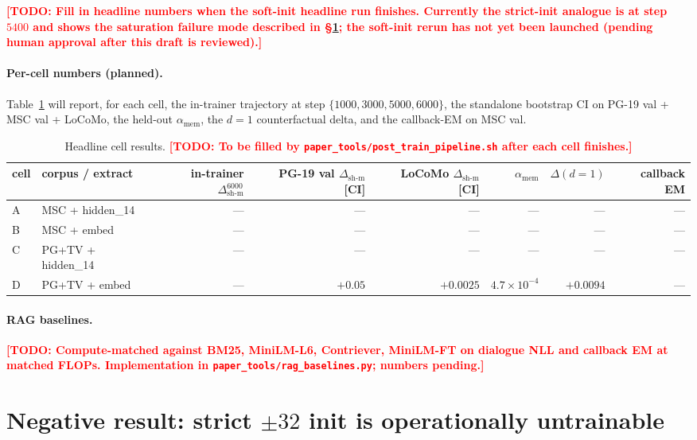 \documentclass{article}
\newcommand{\todo}[1]{\textcolor{red}{\textbf{[TODO: #1]}}}
\newcommand{\dsh}{\Delta_{\text{sh-m}}}
\newcommand{\amem}{\alpha_{\text{mem}}}
\begin{document}
\todo{Fill in headline numbers when the soft-init headline run
finishes. Currently the strict-init analogue is at step $5400$ and
shows the saturation failure mode described in
\S\ref{sec:negative_result}; the soft-init rerun has not yet been
launched (pending human approval after this draft is reviewed).}

\paragraph{Per-cell numbers (planned).} Table~\ref{tab:headline_results}
will report, for each cell, the in-trainer trajectory at step
$\{1000, 3000, 5000, 6000\}$, the standalone bootstrap CI on PG-19
val + MSC val + LoCoMo, the held-out $\amem$, the $d{=}1$
counterfactual delta, and the callback-EM on MSC val.

\begin{table}[t]
\centering
\caption{Headline cell results. \todo{To be filled by
\texttt{paper\_tools/post\_train\_pipeline.sh} after each cell finishes.}}
\label{tab:headline_results}
\small
\begin{tabular}{llrrrrrr}
\toprule
cell & corpus / extract & in-trainer $\dsh^{6000}$ & PG-19 val $\dsh$ [CI] & LoCoMo $\dsh$ [CI] & $\amem$ & $\Delta(d{=}1)$ & callback EM \\
\midrule
A & MSC + hidden\_14 & --- & --- & --- & --- & --- & --- \\
B & MSC + embed      & --- & --- & --- & --- & --- & --- \\
C & PG+TV + hidden\_14 & --- & --- & --- & --- & --- & --- \\
D & PG+TV + embed    & --- & $+0.05$ \cite{liu2025drop} & $+0.0025$ \cite{liu2025drop} & $4.7\!\times\!10^{-4}$ & $+0.0094$ & --- \\
\bottomrule
\end{tabular}
\end{table}

\paragraph{RAG baselines.} \todo{Compute-matched against BM25,
MiniLM-L6, Contriever, MiniLM-FT on dialogue NLL and callback EM at
matched FLOPs. Implementation in
\texttt{paper\_tools/rag\_baselines.py}; numbers pending.}

\section{Negative result: strict $\pm 32$ init is operationally untrainable}
\label{sec:negative_result}
\end{document}
